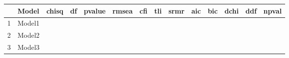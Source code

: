 \begin{table}[ht]
\centering
\begin{tabular}{rllllllllllrrr}
  \hline
 & Model & chisq & df & pvalue & rmsea & cfi & tli & srmr & aic & bic & dchi & ddf & npval \\ 
  \hline
1 & Model1 &  &  &  &  &  &  &  &  &  &  &  &  \\ 
  2 & Model2 &  &  &  &  &  &  &  &  &  &  &  &  \\ 
  3 & Model3 &  &  &  &  &  &  &  &  &  &  &  &  \\ 
   \hline
\end{tabular}
\end{table}
